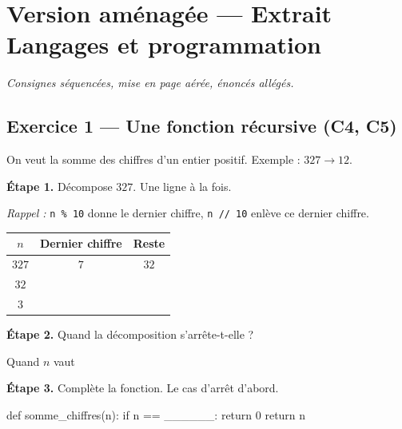 \section*{Version aménagée --- Extrait Langages et programmation}
\textit{Consignes séquencées, mise en page aérée, énoncés allégés.}

\bigskip

\subsection*{Exercice 1 --- Une fonction récursive (C4, C5)}

On veut la somme des chiffres d'un entier positif. Exemple : $327 \rightarrow 12$.

\bigskip

\textbf{Étape 1.} Décompose $327$. Une ligne à la fois.

\medskip
\textit{Rappel :} \lstinline{n % 10} donne le dernier chiffre,
\lstinline{n // 10} enlève ce dernier chiffre.

\bigskip

\begin{center}
\begin{tabular}{|c|c|c|}
\hline
$n$ & \textbf{Dernier chiffre} & \textbf{Reste} \\
\hline
$327$ & $7$ & $32$ \\
\hline
$32$ & \dotfill & \dotfill \\
\hline
$3$ & \dotfill & \dotfill \\
\hline
\end{tabular}
\end{center}

\bigskip

\textbf{Étape 2.} Quand la décomposition s'arrête-t-elle ?

\medskip
Quand $n$ vaut \dotfill

\bigskip

\textbf{Étape 3.} Complète la fonction. Le cas d'arrêt d'abord.

\begin{python}
def somme_chiffres(n):
    if n == ______:
        return 0
    return n %
\end{python}

